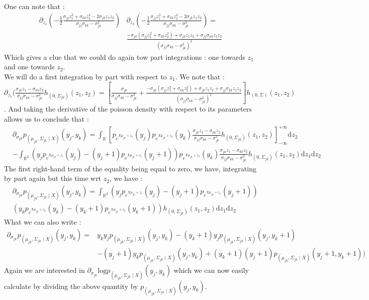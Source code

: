 \documentclass[11pt, a4paper]{article}
\begin{document}
One can note that :
\begin{align*}
\partial_{z_1} ( - \frac{1}{2} \frac{\sigma_{jj} z_1^2 + \sigma_{kk} z_2^2 - 2 \sigma_{jk} z_1 z_2 }{\sigma_{jj} \sigma_{kk}-  \sigma_{jk}^2} ) & \partial_{z_2} ( - \frac{1}{2} \frac{\sigma_{jj} z_1^2 + \sigma_{kk} z_2^2 - 2 \sigma_{jk} z_1 z_2 }{\sigma_{jj} \sigma_{kk}-  \sigma_{jk}^2} ) =\\
&  \frac{-\sigma_{jk} ( \sigma_{jj} z_1^2 + \sigma_{kk} z_2^2 ) + \sigma_{jk} z_1 z_2 + \sigma_{jj} \sigma_{kk} z_1 z_2}{(\sigma_{jj} \sigma_{kk} - \sigma_{jk}^2)^2}
\end{align*}
Which gives a clue that we could do again tow part integrations : one towards $z_1$ and one towards $z_2$. \\
We will do a first integration by part with respect to $z_1$. We note that : $ \partial_{z_1} ( \frac{\sigma_{jk}z_1-\sigma_{kk}z_2}{\sigma_{jj} \sigma_{kk}- \sigma_{jk}^2} h_{(0,\Sigma_{jk})}(z_1,z_2) = [\frac{\sigma_{jk}}{\sigma_{jj} \sigma_{kk} - \sigma_{jk}^2} + \frac{-\sigma_{jk} ( \sigma_{jj} z_1^2 + \sigma_{kk} z_2^2 ) + \sigma_{jk} z_1 z_2 + \sigma_{jj} \sigma_{kk} z_1 z_2}{(\sigma_{jj} \sigma_{kk} - \sigma_{jk}^2)^2}] h_{(0,\Sigma)}(z_1,z_2)$. And taking the derivative of the poisson density with respect to its parameters allows us to conclude that :
\begin{align*}
&\partial_{\sigma_{jk}}p_{(\mu_{jk},\Sigma_{jk} \mid X)}(y_j,y_k) = \int_{\mathbb{R}} [ p_{e^{X\mu_{jk}+z_1}}(y_j) p_{e^{X\mu_{jk}+z_2}}(y_k) \frac{\sigma_{jk}z_1-\sigma_{kk}z_2}{\sigma_{jj} \sigma_{kk}- \sigma_{jk}^2} h_{(0,\Sigma_{jk})}(z_1,z_2)]_{- \infty}^{+ \infty} \mathrm{d}z_2\\
& - \int_{\mathbb{R}^2} (y_j p_{e^{X\mu_{jk}+z_1}}(y_j)- (y_j+1) p_{e^{X\mu_{jk}+z_1}}(y_j+1)) p_{e^{X\mu_{jk}+z_2}}(y_k) \frac{\sigma_{jk} z_1 - \sigma_{kk} z_2}{\sigma_{jj} \sigma_{kk} - \sigma_{jk}^2} h_{(0,\Sigma_{jk})}(z_1,z_2) \mathrm{d}z_1  \mathrm{d}z_2
\end{align*}
The first right-hand term of the equality being equal to zero, we have, integrating by part again but this time wrt $z_2$, we have :
\begin{align*}
&\partial_{\sigma_{jk}}p_{(\mu_{jk},\Sigma_{jk} \mid X)}(y_j,y_k) =\int_{\mathbb{R}^2} (y_j p_{e^{X\mu_{jk}+z_1}}(y_j)- (y_j+1) p_{e^{X\mu_{jk}+z_1}}(y_j+1))\\
& (y_k p_{e^{X\mu_{jk}+z_2}}(y_k)-(y_k + 1) p_{e^{X\mu_{jk}+z_2}}(y_k+1))  h_{(0,\Sigma_{jk})}(z_1,z_2) \mathrm{d}z_1  \mathrm{d}z_2
\end{align*}
What we can also write :
\begin{align*}
\partial_{\sigma_{jk}}p_{(\mu_{jk},\Sigma_{jk} \mid X)}(y_j,y_k) = &y_k y_j p_{(\mu_{jk},\Sigma_{jk} \mid X)}(y_j,y_k)-(y_k+1)y_j p_{(\mu_{jk},\Sigma_{jk} \mid X)}(y_j,y_k+1)\\
& -(y_j+1)y_k p_{(\mu_{jk},\Sigma_{jk} \mid X)}(y_j,y_k)+ (y_k+1) (y_j+1)p_{(\mu_{jk},\Sigma_{jk} \mid X)}(y_j+1,y_k+1))
\end{align*}
Again we are interested in $\partial_{\sigma_{jk}}\mathrm{log}p_{(\mu_{jk},\Sigma_{jk} \mid X)}(y_j,y_k)$ which we can now easily calculate by dividing the above quantity by $p_{(\mu_{jk},\Sigma_{jk} \mid X)}(y_j,y_k)$.


\end{document}

